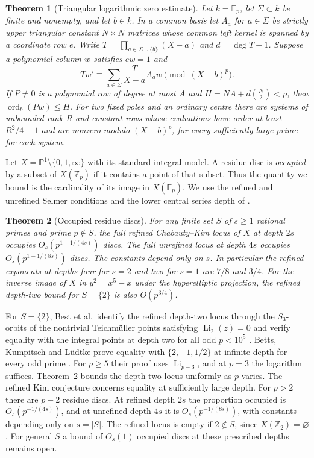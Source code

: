 \documentclass[11pt]{article}
\newtheorem{theorem}{Theorem}[section]
\DeclareMathOperator{\Li}{Li}
\begin{document}
\begin{theorem}[Triangular logarithmic zero estimate]\label{thm:zero}
Let \(k=\mathbb F_p\), let \(\Sigma\subset k\) be finite and nonempty, and
let \(b\in k\). In a common basis let \(A_a\) for \(a\in\Sigma\) be strictly
upper triangular constant \(N\times N\) matrices whose common left kernel
is spanned by a coordinate row \(e\). Write
\(T=\prod_{a\in\Sigma\cup\{b\}}(X-a)\) and \(d=\deg T-1\).
Suppose a polynomial column \(w\) satisfies \(ew=1\) and
\[
 T w'\equiv\sum_{a\in\Sigma}\frac{T}{X-a} A_a w\pmod{(X-b)^p}.
\]
If \(P\ne0\) is a polynomial row of degree at most \(A\) and
\(H=NA+d\binom{N}{2}<p\), then \(\operatorname{ord}_b(Pw)\le H\).
For two fixed poles and an ordinary centre there are systems of unbounded
rank \(R\) and constant rows whose evaluations have order at least
\(R^2/4-1\) and are nonzero modulo \((X-b)^p\), for every sufficiently
large prime for each system.
\end{theorem}

Let \(X=\mathbb P^1\setminus\{0,1,\infty\}\) with its standard integral
model. A residue disc is \emph{occupied} by a subset of \(X(\mathbb Z_p)\)
if it contains a point of that subset. Thus the quantity we bound is the
cardinality of its image in \(X(\mathbb F_p)\). We use the refined and
unrefined Selmer conditions and the lower central series depth
of \cite{BKL}.
\begin{theorem}[Occupied residue discs]\label{thm:discs}
For any finite set \(S\) of \(s\ge1\) rational primes and prime \(p\notin S\),
the full refined Chabauty--Kim locus of \(X\) at depth \(2s\) occupies
\(O_s(p^{1-1/(4s)})\) discs. The full unrefined locus at depth \(4s\)
occupies \(O_s(p^{1-1/(8s)})\) discs. The constants depend only on \(s\).
In particular the refined exponents at depths four for \(s=2\) and two
for \(s=1\) are \(7/8\) and \(3/4\). For the inverse image of \(X\) in
\(y^2=x^5-x\) under the hyperelliptic projection, the refined depth-two
bound for \(S=\{2\}\) is also \(O(p^{3/4})\).
\end{theorem}

For $S=\{2\}$, Best et al.\ identify the refined depth-two locus through
the $S_3$-orbits of the nontrivial Teichm\"uller points satisfying
$\Li_2(z)=0$ and verify equality with the integral points at depth two for
all odd $p<10^5$ \cite[Theorem~A and Remark~3.6]{BestEtAl}.
Betts, Kumpitsch and L\"udtke prove equality with $\{2,-1,1/2\}$
at infinite depth for every odd prime \cite[Corollary~5.17]{BKL}.
For $p\ge5$ their proof uses $\Li_{p-3}$, and at $p=3$ the logarithm
suffices. Theorem~\ref{thm:discs} bounds the depth-two locus uniformly
as $p$ varies. The refined Kim conjecture concerns equality at sufficiently
large depth. For $p>2$ there are $p-2$ residue discs. At refined depth
$2s$ the proportion occupied is $O_s(p^{-1/(4s)})$, and at unrefined
depth $4s$ it is $O_s(p^{-1/(8s)})$, with constants depending only on
$s=|S|$. The refined locus is empty if $2\notin S$, since
$X(\mathbb Z_2)=\varnothing$. For general $S$ a bound of $O_s(1)$
occupied discs at these prescribed depths remains open.
\end{document}
